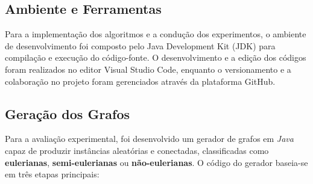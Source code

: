 \documentclass[12pt]{article}
\begin{document}
\subsection{Ambiente e Ferramentas}

Para a implementação dos algoritmos e a condução dos experimentos, o ambiente de desenvolvimento foi composto pelo Java Development Kit (JDK) para compilação e execução do código-fonte. O desenvolvimento e a edição dos códigos foram realizados no editor Visual Studio Code, enquanto o versionamento e a colaboração no projeto foram gerenciados através da plataforma GitHub.

\subsection{Geração dos Grafos}

Para a avaliação experimental, foi desenvolvido um gerador de grafos em \textit{Java}
capaz de produzir instâncias aleatórias e conectadas, classificadas como
\textbf{eulerianas}, \textbf{semi-eulerianas} ou \textbf{não-eulerianas}.
O código do gerador baseia-se em três etapas principais:
\end{document}

